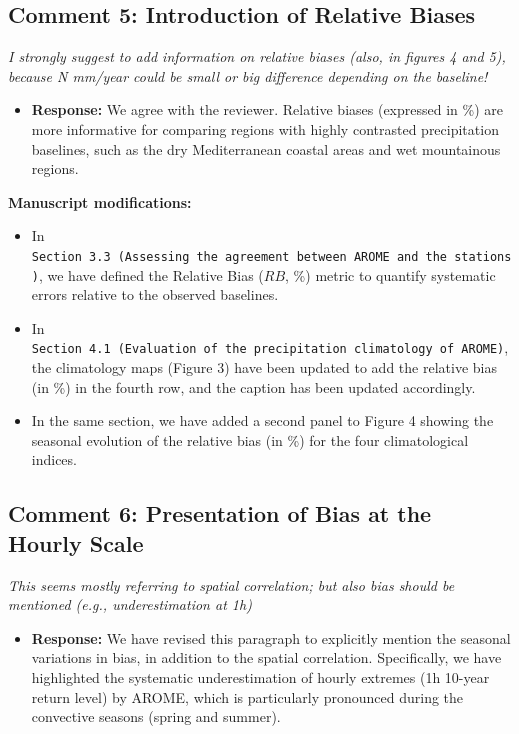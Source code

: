 \documentclass[
  letterpaper,
  DIV=11,
  numbers=noendperiod]{scrartcl}
\providecommand{\tightlist}{%
  \setlength{\itemsep}{0pt}\setlength{\parskip}{0pt}}\usepackage{longtable,booktabs,array}
\begin{document}
\subsection{Comment 5: Introduction of Relative
Biases}\label{comment-5-introduction-of-relative-biases}

\emph{I strongly suggest to add information on relative biases (also, in
figures 4 and 5), because N mm/year could be small or big difference
depending on the baseline!}

\begin{itemize}
\tightlist
\item
  \textbf{Response:} We agree with the reviewer. Relative biases
  (expressed in \%) are more informative for comparing regions with
  highly contrasted precipitation baselines, such as the dry
  Mediterranean coastal areas and wet mountainous regions.
\end{itemize}

\textbf{Manuscript modifications:}

\begin{itemize}
\tightlist
\item
  In
  \texttt{Section\ 3.3\ (Assessing\ the\ agreement\ between\ AROME\ and\ the\ stations)},
  we have defined the Relative Bias (\(RB\), \%) metric to quantify
  systematic errors relative to the observed baselines.
\item
  In
  \texttt{Section\ 4.1\ (Evaluation\ of\ the\ precipitation\ climatology\ of\ AROME)},
  the climatology maps (Figure 3) have been updated to add the relative
  bias (in \%) in the fourth row, and the caption has been updated
  accordingly.
\item
  In the same section, we have added a second panel to Figure 4 showing
  the seasonal evolution of the relative bias (in \%) for the four
  climatological indices.
\end{itemize}

\subsection{Comment 6: Presentation of Bias at the Hourly
Scale}\label{comment-6-presentation-of-bias-at-the-hourly-scale}

\emph{This seems mostly referring to spatial correlation; but also bias
should be mentioned (e.g., underestimation at 1h)}

\begin{itemize}
\tightlist
\item
  \textbf{Response:} We have revised this paragraph to explicitly
  mention the seasonal variations in bias, in addition to the spatial
  correlation. Specifically, we have highlighted the systematic
  underestimation of hourly extremes (1h 10-year return level) by AROME,
  which is particularly pronounced during the convective seasons (spring
  and summer).
\end{itemize}
\end{document}
